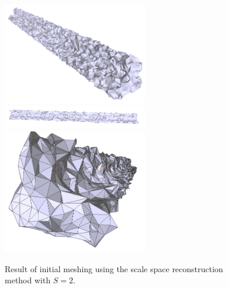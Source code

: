 \documentclass[12pt]{drexelthesis}
\begin{document}
\begin{figure}[!ht] 
	
	\centering
		\includegraphics[width=2.5in]{simulated-lab-scan/2cmnoise/2cmmesh/scalespace200.png}
		\includegraphics[width=2.5in]{simulated-lab-scan/2cmnoise/2cmmesh/scalespace201.png}
		\includegraphics[width=2.5in]{simulated-lab-scan/2cmnoise/2cmmesh/scalespace202.png}
		\caption[Initial meshing using a scale space reconstruction with $S = 2$]{\centering  Result of initial meshing using the scale space reconstruction method with $S = 2$.}
		\label{2cmnoise:scalepspace2}
\end{figure}
\end{document}
